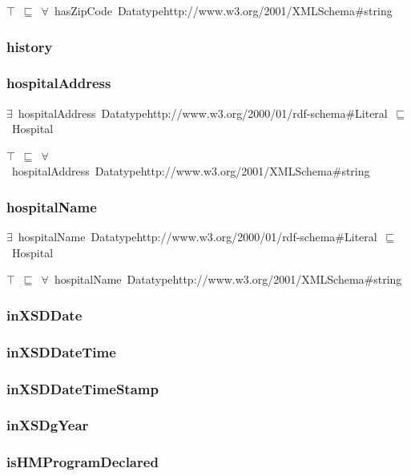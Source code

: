\documentclass{article}
\begin{document}
\ensuremath{\top}~\ensuremath{\sqsubseteq}~\ensuremath{\forall}~hasZipCode~Datatypehttp://www.w3.org/2001/XMLSchema#string

\subsubsection*{history}

\subsubsection*{hospitalAddress}

\ensuremath{\exists}~hospitalAddress~Datatypehttp://www.w3.org/2000/01/rdf-schema#Literal~\ensuremath{\sqsubseteq}~Hospital

\ensuremath{\top}~\ensuremath{\sqsubseteq}~\ensuremath{\forall}~hospitalAddress~Datatypehttp://www.w3.org/2001/XMLSchema#string

\subsubsection*{hospitalName}

\ensuremath{\exists}~hospitalName~Datatypehttp://www.w3.org/2000/01/rdf-schema#Literal~\ensuremath{\sqsubseteq}~Hospital

\ensuremath{\top}~\ensuremath{\sqsubseteq}~\ensuremath{\forall}~hospitalName~Datatypehttp://www.w3.org/2001/XMLSchema#string

\subsubsection*{inXSDDate}

\subsubsection*{inXSDDateTime}

\subsubsection*{inXSDDateTimeStamp}

\subsubsection*{inXSDgYear}

\subsubsection*{isHMProgramDeclared}
\end{document}
